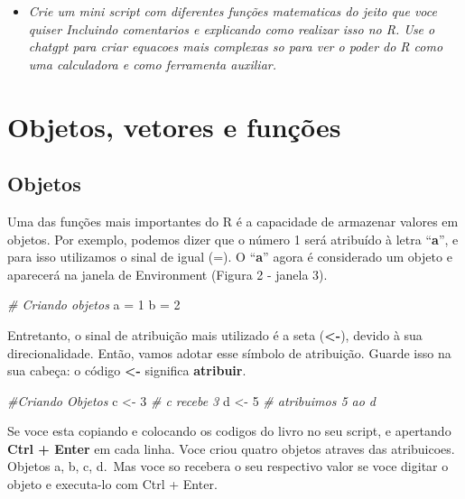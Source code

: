 \documentclass[
]{book}
\newenvironment{Shaded}{\begin{snugshade}}{\end{snugshade}}
\newcommand{\CommentTok}[1]{\textcolor[rgb]{0.56,0.35,0.01}{\textit{#1}}}
\newcommand{\DecValTok}[1]{\textcolor[rgb]{0.00,0.00,0.81}{#1}}
\newcommand{\NormalTok}[1]{#1}
\newcommand{\OtherTok}[1]{\textcolor[rgb]{0.56,0.35,0.01}{#1}}
\providecommand{\tightlist}{%
  \setlength{\itemsep}{0pt}\setlength{\parskip}{0pt}}
\begin{document}
\begin{itemize}
\tightlist
\item
  \emph{Crie um mini script com diferentes funções matematicas do jeito que voce quiser
  Incluindo comentarios e explicando como realizar isso no R. Use o chatgpt para criar equacoes mais complexas so para ver o poder do R como uma calculadora e como ferramenta auxiliar.}
\end{itemize}

\hypertarget{objetos-vetores-e-funuxe7uxf5es}{%
\section{Objetos, vetores e funções}\label{objetos-vetores-e-funuxe7uxf5es}}

\hypertarget{objetos}{%
\subsection{Objetos}\label{objetos}}

Uma das funções mais importantes do R é a capacidade de armazenar valores em objetos. Por exemplo, podemos dizer que o número 1 será atribuído à letra ``\textbf{a}'', e para isso utilizamos o sinal de igual (=). O ``\textbf{a}'' agora é considerado um objeto e aparecerá na janela de Environment (Figura 2 - janela 3).

\begin{Shaded}
\begin{Highlighting}[]
\CommentTok{\# Criando objetos}
\NormalTok{a }\OtherTok{=} \DecValTok{1}  
\NormalTok{b }\OtherTok{=} \DecValTok{2}  
\end{Highlighting}
\end{Shaded}

Entretanto, o sinal de atribuição mais utilizado é a seta (\textbf{\textless-}), devido à sua direcionalidade. Então, vamos adotar esse símbolo de atribuição. Guarde isso na sua cabeça: o código \textbf{\textless-} significa \textbf{atribuir}.

\begin{Shaded}
\begin{Highlighting}[]
\CommentTok{\#Criando Objetos}
\NormalTok{c }\OtherTok{\textless{}{-}} \DecValTok{3} \CommentTok{\# c recebe 3}
\NormalTok{d }\OtherTok{\textless{}{-}} \DecValTok{5} \CommentTok{\# atribuimos 5 ao d}
\end{Highlighting}
\end{Shaded}

Se voce esta copiando e colocando os codigos do livro no seu script, e apertando \textbf{Ctrl + Enter} em cada linha. Voce criou quatro objetos atraves das atribuicoes. Objetos a, b, c, d.~Mas voce so recebera o seu respectivo valor se voce digitar o objeto e executa-lo com Ctrl + Enter.
\end{document}
